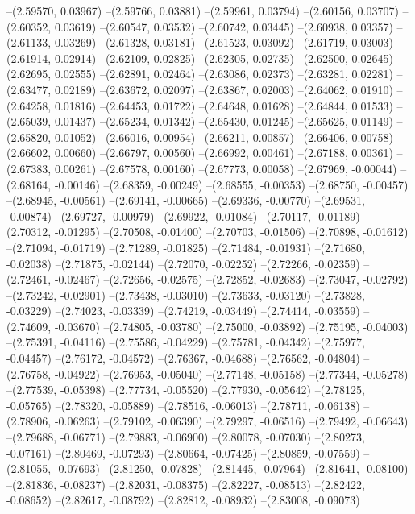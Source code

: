 --(2.59570, 0.03967)
--(2.59766, 0.03881)
--(2.59961, 0.03794)
--(2.60156, 0.03707)
--(2.60352, 0.03619)
--(2.60547, 0.03532)
--(2.60742, 0.03445)
--(2.60938, 0.03357)
--(2.61133, 0.03269)
--(2.61328, 0.03181)
--(2.61523, 0.03092)
--(2.61719, 0.03003)
--(2.61914, 0.02914)
--(2.62109, 0.02825)
--(2.62305, 0.02735)
--(2.62500, 0.02645)
--(2.62695, 0.02555)
--(2.62891, 0.02464)
--(2.63086, 0.02373)
--(2.63281, 0.02281)
--(2.63477, 0.02189)
--(2.63672, 0.02097)
--(2.63867, 0.02003)
--(2.64062, 0.01910)
--(2.64258, 0.01816)
--(2.64453, 0.01722)
--(2.64648, 0.01628)
--(2.64844, 0.01533)
--(2.65039, 0.01437)
--(2.65234, 0.01342)
--(2.65430, 0.01245)
--(2.65625, 0.01149)
--(2.65820, 0.01052)
--(2.66016, 0.00954)
--(2.66211, 0.00857)
--(2.66406, 0.00758)
--(2.66602, 0.00660)
--(2.66797, 0.00560)
--(2.66992, 0.00461)
--(2.67188, 0.00361)
--(2.67383, 0.00261)
--(2.67578, 0.00160)
--(2.67773, 0.00058)
--(2.67969, -0.00044)
--(2.68164, -0.00146)
--(2.68359, -0.00249)
--(2.68555, -0.00353)
--(2.68750, -0.00457)
--(2.68945, -0.00561)
--(2.69141, -0.00665)
--(2.69336, -0.00770)
--(2.69531, -0.00874)
--(2.69727, -0.00979)
--(2.69922, -0.01084)
--(2.70117, -0.01189)
--(2.70312, -0.01295)
--(2.70508, -0.01400)
--(2.70703, -0.01506)
--(2.70898, -0.01612)
--(2.71094, -0.01719)
--(2.71289, -0.01825)
--(2.71484, -0.01931)
--(2.71680, -0.02038)
--(2.71875, -0.02144)
--(2.72070, -0.02252)
--(2.72266, -0.02359)
--(2.72461, -0.02467)
--(2.72656, -0.02575)
--(2.72852, -0.02683)
--(2.73047, -0.02792)
--(2.73242, -0.02901)
--(2.73438, -0.03010)
--(2.73633, -0.03120)
--(2.73828, -0.03229)
--(2.74023, -0.03339)
--(2.74219, -0.03449)
--(2.74414, -0.03559)
--(2.74609, -0.03670)
--(2.74805, -0.03780)
--(2.75000, -0.03892)
--(2.75195, -0.04003)
--(2.75391, -0.04116)
--(2.75586, -0.04229)
--(2.75781, -0.04342)
--(2.75977, -0.04457)
--(2.76172, -0.04572)
--(2.76367, -0.04688)
--(2.76562, -0.04804)
--(2.76758, -0.04922)
--(2.76953, -0.05040)
--(2.77148, -0.05158)
--(2.77344, -0.05278)
--(2.77539, -0.05398)
--(2.77734, -0.05520)
--(2.77930, -0.05642)
--(2.78125, -0.05765)
--(2.78320, -0.05889)
--(2.78516, -0.06013)
--(2.78711, -0.06138)
--(2.78906, -0.06263)
--(2.79102, -0.06390)
--(2.79297, -0.06516)
--(2.79492, -0.06643)
--(2.79688, -0.06771)
--(2.79883, -0.06900)
--(2.80078, -0.07030)
--(2.80273, -0.07161)
--(2.80469, -0.07293)
--(2.80664, -0.07425)
--(2.80859, -0.07559)
--(2.81055, -0.07693)
--(2.81250, -0.07828)
--(2.81445, -0.07964)
--(2.81641, -0.08100)
--(2.81836, -0.08237)
--(2.82031, -0.08375)
--(2.82227, -0.08513)
--(2.82422, -0.08652)
--(2.82617, -0.08792)
--(2.82812, -0.08932)
--(2.83008, -0.09073)
